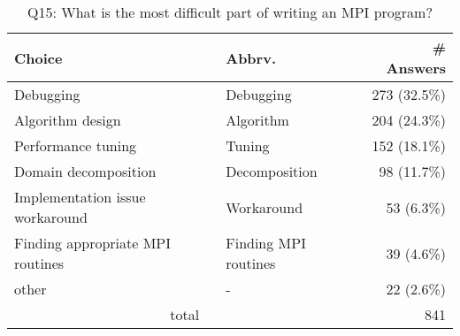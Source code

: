 \begin{table}[htb]%
\begin{center}%
\caption{Q15: What is the most difficult part of writing an MPI program?}%
\label{tab:Q15-ans}%
\begin{tabular}{l|l|r}%
\hline%
Choice & Abbrv. & \# Answers \\%
\hline%
Debugging & Debugging & 273 (32.5\%) \\%
Algorithm design & Algorithm & 204 (24.3\%) \\%
Performance tuning & Tuning & 152 (18.1\%) \\%
Domain decomposition & Decomposition & 98 (11.7\%) \\%
Implementation issue workaround & Workaround & 53 (6.3\%) \\%
Finding appropriate MPI routines & Finding MPI routines & 39 (4.6\%) \\%
other & - & 22 (2.6\%) \\%
\hline%
\multicolumn{2}{c}{total} & 841 \\%
\hline%
\end{tabular}%
\end{center}%
\end{table}%
